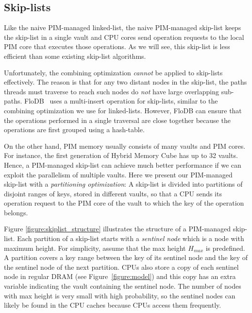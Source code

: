 \subsection{Skip-lists}
\label{section:skip_list}


Like the naive PIM-managed linked-list, the naive PIM-managed
skip-list keeps the skip-list in a single vault and CPU cores send
operation requests to the local PIM core that executes those
operations.  As we will see, this skip-list is less efficient than
some existing skip-list algorithms.

Unfortunately, the combining optimization \emph{cannot} be applied to skip-lists effectively.
The reason is that for any two distant nodes in the skip-list,
the paths threads must traverse to reach such nodes do \emph{not} have large overlapping sub-paths. 
FloDB~\cite{flodb} uses a multi-insert operation for skip-lists, similar to the combining 
optimization we use for linked-lists. However, FloDB can ensure that the operations performed in 
a single traversal are close together because the operations are first grouped using a hash-table.  

On the other hand, PIM memory usually consists of many vaults and PIM cores.
For instance, the first generation of Hybrid Memory Cube \cite{website:HMC} has up to 32 vaults.
Hence, a PIM-managed skip-list can achieve much better performance if
we can exploit the parallelism of multiple vaults.
Here we present our PIM-managed skip-list with a \textit{partitioning optimization}:
A skip-list is divided into partitions of disjoint ranges of keys,
stored in different vaults, so that a CPU sends its operation request to
the PIM core of the vault to which the key of the operation belongs.

Figure \ref{figure:skiplist_structure} illustrates the structure of a
PIM-managed skip-list.  Each partition of a skip-list starts with a
\textit{sentinel node} which is a node with maximum height.  For
simplicity, assume that the max height $H_{max}$ is predefined.  A
partition covers a key range between the key of its sentinel node and
the key of the sentinel node of the next partition.  CPUs also store a
copy of each sentinel node in regular DRAM (see
Figure~\ref{figure:model}) and this copy has an extra variable
indicating the vault containing the sentinel node.  The number of
nodes with max height is very small with high probability, so the
sentinel nodes can likely be found in the CPU caches because CPUs
access them frequently.

